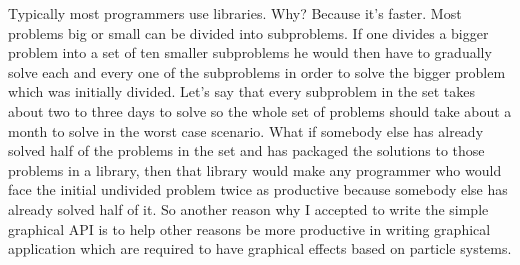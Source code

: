 Typically most programmers use libraries. Why? Because it's faster. Most problems big or small can be divided into subproblems. If one divides a bigger problem into a set of ten smaller subproblems he would then have to gradually solve each and every one of the subproblems in order to solve the bigger problem which was initially divided. Let's say that every subproblem in the set takes about two to three days to solve so the whole set of problems should take about a month to solve in the worst case scenario. What if somebody else has already solved half of the problems in the set and has packaged the solutions to those problems in a library, then that library would make any programmer who would face the initial undivided problem twice as productive because somebody else has already solved half of it. So another reason why I accepted to write the simple graphical API is to help other reasons be more productive in writing graphical application which are required to have graphical effects based on particle systems.